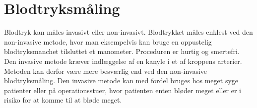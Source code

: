 \section{Blodtryksmåling}
\vspace{0.2 cm}
Blodtryk kan måles invasivt eller non-invasivt. Blodtrykket måles enklest ved den non-invasive metode, hvor man eksempelvis kan bruge en oppustelig blodtryksmanchet tilsluttet et manometer. Proceduren er hurtig og smertefri.
\vspace{0.2 cm}
Den invasive metode kræver indlæggelse af en kanyle i et af kroppens arterier. Metoden kan derfor være mere besværlig end ved den non-invasive blodtryksmåling. Den invasive metode kan med fordel bruges hos meget syge patienter eller på operationsstuer, hvor patienten enten bløder meget eller er i risiko for at komme til at bløde meget.  